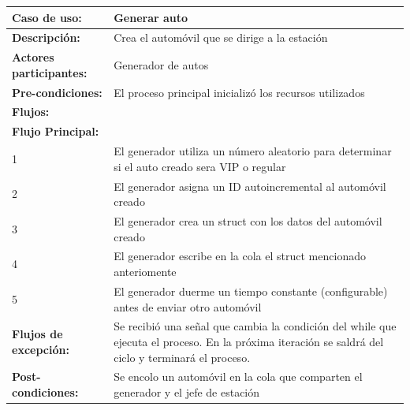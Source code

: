 \documentclass[12pt,a4paper,spanish]{article}
\begin{document}
    \begin{tabular}{|p{4cm}|p{12cm}|}
    \hline
    \textbf{Caso de uso:} & Generar auto \\
    \hline
    \textbf{Descripción:} &  Crea el automóvil que se dirige a la estación\\
    \hline
    \textbf{Actores participantes:} & Generador de autos  \\
    \hline
 
    \textbf{Pre-condiciones:} &  El proceso principal inicializó los recursos utilizados\\
    \hline
    \hline
    \textbf{Flujos:} &\\
    \hline
	\textbf{Flujo Principal:} &\\ 

	\hline
	1 & El generador utiliza un número aleatorio para determinar si el auto creado sera VIP o regular\\
    \hline
	2 & El generador asigna un ID autoincremental al automóvil creado\\
    \hline
	3 & El generador crea un struct con los datos del automóvil creado\\
    \hline
	4 & El generador escribe en la cola el struct mencionado anteriomente\\
    \hline
	5 & El generador duerme un tiempo constante (configurable) antes de enviar otro automóvil\\
    \hline
    \hline
	\textbf{Flujos de excepción:} & Se recibió una señal que cambia la condición del while que ejecuta el proceso. En la próxima iteración se saldrá del ciclo y terminará el proceso.\\
    \hline
	\textbf{Post-condiciones:} & Se encolo un automóvil en la cola que comparten el generador y el jefe de estación\\
	\hline
	\end{tabular}

	\newpage
\end{document}

